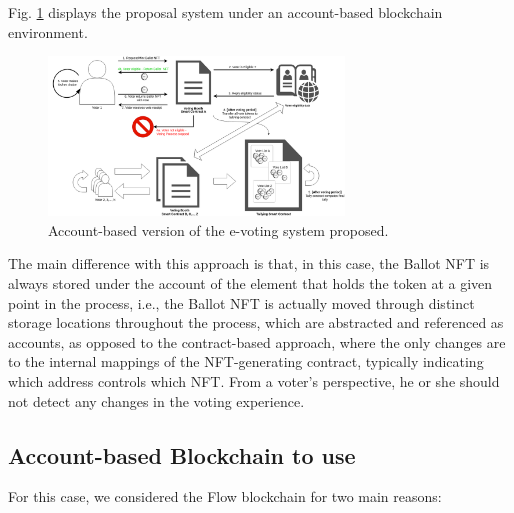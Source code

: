 \documentclass[./4_GeneralApproach.tex]{subfiles}
\begin{document}
Fig. \ref{fig:account_based_architecture} displays the proposal system under an account-based blockchain environment.

\begin{figure}[htp]
    \centering
    \includegraphics[width=0.7\textwidth]{../Images/03_account_based_solution.png}
    \caption{Account-based version of the e-voting system proposed.}
    \label{fig:account_based_architecture}
\end{figure}

The main difference with this approach is that, in this case, the Ballot NFT is always stored under the account of the element that holds the token at a given point in the process, i.e., the Ballot NFT is actually moved through distinct storage locations throughout the process, which are abstracted and referenced as accounts, as opposed to the contract-based approach, where the only changes are to the internal mappings of the NFT-generating contract, typically indicating which address controls which NFT. From a voter's perspective, he or she should not detect any changes in the voting experience.

\subsection{Account-based Blockchain to use}
For this case, we considered the Flow blockchain for two main reasons:
\end{document}
